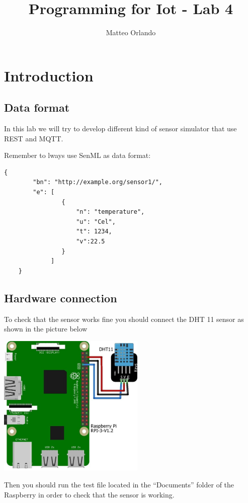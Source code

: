 \documentclass[a4paper]{article}
\author{Matteo Orlando}
\date{}
\title{Programming for Iot - Lab 4}
\begin{document}
\maketitle
\tableofcontents


\section{Introduction}
\label{sec:org82c4036}

\subsection{Data format}
\label{sec:org8f19d80}
In this lab we will try to develop different kind of sensor simulator
that use REST and MQTT.

Remember to lways use SenML as data format:

\begin{verbatim}
{
        "bn": "http://example.org/sensor1/",
        "e": [
                {
                    "n": "temperature",
                    "u": "Cel",
                    "t": 1234,
                    "v":22.5
                }
             ]
    }
\end{verbatim}

\subsection{Hardware connection}
\label{sec:org009fb14}
To check that the sensor works fine you should connect the DHT 11 sensor as
shown in the picture below

\begin{center}
\includegraphics[width=7cm]{./images/dht11.jpg}
\end{center}

Then you should run the test file located in the ``Documents'' folder of the
Raspberry in order to check that the sensor is working.
\end{document}
